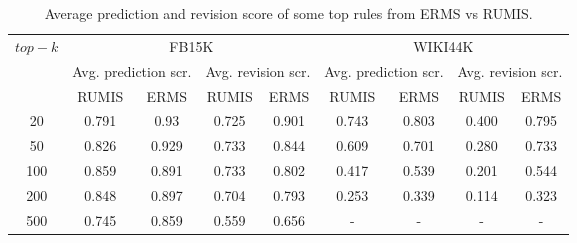 \begin{table}[t]
\scriptsize
\centering
\begin{tabular}{|c|c c|c c|c c|c c|}
 
 \multirow{3}{*}{$top-k$}&\multicolumn{4}{|c|}{FB15K} & \multicolumn{4}{|c|}{WIKI44K}\\
 \cmidrule{2-9}&\multicolumn{2}{|c|}{Avg. prediction scr.}&\multicolumn{2}{|c|}{Avg. revision scr.}&\multicolumn{2}{|c|}{Avg. prediction scr.}&\multicolumn{2}{|c|}{Avg. revision scr.} \\
 \cmidrule{2-9} & RUMIS & ERMS & RUMIS & ERMS & RUMIS & ERMS & RUMIS & ERMS \\
20 & 0.791 & 0.93 & 0.725 & 0.901 & 0.743 & 0.803 & 0.400 & 0.795 \\
50 & 0.826 & 0.929 & 0.733 & 0.844 & 0.609 & 0.701 & 0.280 & 0.733 \\
100 & 0.859 & 0.891 & 0.733 & 0.802 & 0.417 & 0.539 & 0.201 & 0.544\\
200 & 0.848 & 0.897 & 0.704 & 0.793 & 0.253 & 0.339 & 0.114 & 0.323\\
500 & 0.745 & 0.859 & 0.559 & 0.656 & - & - & - & - \\

\end{tabular}
\caption{Average prediction and revision score of some top rules from ERMS vs RUMIS.}
\label{table:exception_result}
\end{table}
